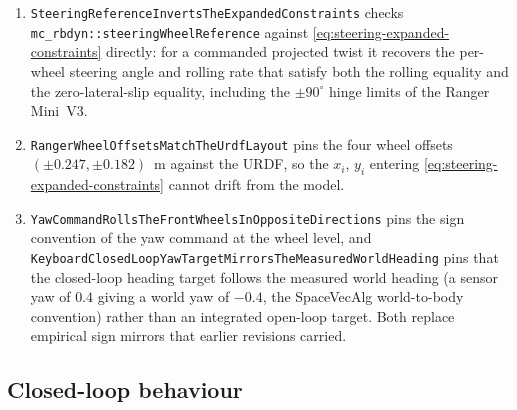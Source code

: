 \documentclass[10pt]{article}
\begin{document}
\begin{enumerate}

\item \texttt{SteeringReferenceInvertsTheExpandedConstraints} checks
  \texttt{mc\_rbdyn::steeringWheelReference} against
  \eqref{eq:steering-expanded-constraints} directly: for a commanded projected
  twist it recovers the per-wheel steering angle and rolling rate that satisfy
  both the rolling equality and the zero-lateral-slip equality, including the
  $\pm 90^{\circ}$ hinge limits of the Ranger Mini~V3.

\item \texttt{RangerWheelOffsetsMatchTheUrdfLayout} pins the four wheel offsets
  $(\pm 0.247, \pm 0.182)$~m against the URDF, so the $x_i$, $y_i$ entering
  \eqref{eq:steering-expanded-constraints} cannot drift from the model.

\item \texttt{YawCommandRollsTheFrontWheelsInOppositeDirections} pins the sign
  convention of the yaw command at the wheel level, and
  \texttt{KeyboardClosedLoopYawTargetMirrorsTheMeasuredWorldHeading} pins that
  the closed-loop heading target follows the measured world heading (a sensor
  yaw of $0.4$ giving a world yaw of $-0.4$, the SpaceVecAlg world-to-body
  convention) rather than an integrated open-loop target. Both replace
  empirical sign mirrors that earlier revisions carried.

\end{enumerate}

\subsection{Closed-loop behaviour}
\label{sec:validation-closed-loop}
\end{document}

